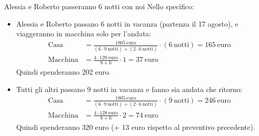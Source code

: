 \documentclass[8pt]{beamer}
\begin{document}
\begin{frame}[label={sec:orgfeb33ca}]{Alessia e Roberto passeranno 6 notti con noi}
Nello specifico:
\begin{itemize}
\item \alert{Alessia e Roberto} passano 6 notti in vacanza (partenza il 17 agosto), e viaggeranno in macchina solo per l'andata:
\begin{align*}
  \text{Casa} &= \frac{1805\ \text{euro}}{(6 \cdot 9\ \text{notti}) + (2\cdot 6\ \text{notti})} \cdot (6\ \text{notti}) = 165 \ \text{euro}\\[2ex]
  \text{Macchina} &= \frac{4\cdot 128\ \text{euro}}{8 + 6} \cdot 1 = 37\ \text{euro}
\end{align*}
Quindi spenderanno \alert{202 euro}.
\item \alert{Tutti gli altri} passano 9 notti in vacanza e fanno sia andata che ritorno:
\begin{align*}
  \text{Casa} &= \frac{1805\ \text{euro}}{(6 \cdot 9\ \text{notti}) + (2\cdot 6\ \text{notti})} \cdot (9\ \text{notti}) = 246\ \text{euro}\\[2ex]
  \text{Macchina} &= \frac{4\cdot 128\ \text{euro}}{8 + 6} \cdot 2 = 74\ \text{euro}
\end{align*}
Quindi spenderanno \alert{320 euro} (+ 13 euro rispetto al preventivo precedente).
\end{itemize}
\end{frame}
\end{document}
